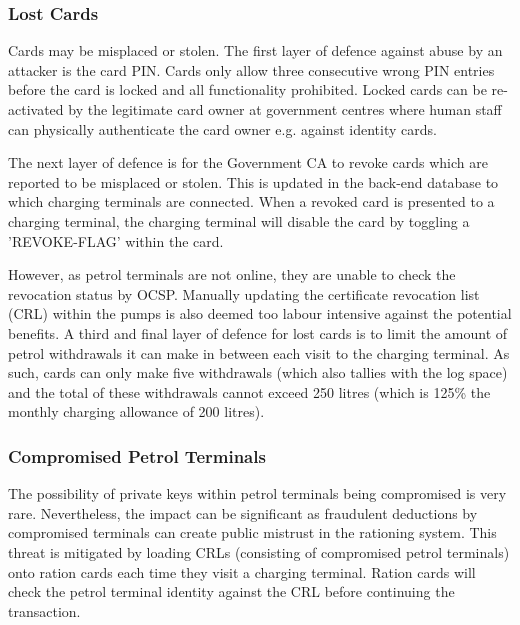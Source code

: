 \subsubsection{Lost Cards}
Cards may be misplaced or stolen. The first layer of defence against abuse by an attacker is the card PIN. Cards only allow three consecutive wrong PIN entries before the card is locked and all functionality prohibited. Locked cards can be re-activated by the legitimate card owner at government centres where human staff can physically authenticate the card owner e.g. against identity cards.

The next layer of defence is for the Government CA to revoke cards which are reported to be misplaced or stolen. This is updated in the back-end database to which charging terminals are connected. When a revoked card is presented to a charging terminal, the charging terminal will disable the card by toggling a 'REVOKE-FLAG' within the card.

However, as petrol terminals are not online, they are unable to check the revocation status by OCSP. Manually updating the certificate revocation list (CRL) within the pumps is also deemed too labour intensive against the potential benefits. A third and final layer of defence for lost cards is to limit the amount of petrol withdrawals it can make in between each visit to the charging terminal. As such, cards can only make five withdrawals (which also tallies with the log space) and the total of these withdrawals cannot exceed 250 litres (which is 125\% the monthly charging allowance of 200 litres).

\subsubsection{Compromised Petrol Terminals}
The possibility of private keys within petrol terminals being compromised is very rare. Nevertheless, the impact can be significant as fraudulent deductions by compromised terminals can create public mistrust in the rationing system. This threat is mitigated by loading CRLs (consisting of compromised petrol terminals) onto ration cards each time they visit a charging terminal. Ration cards will check the petrol terminal identity against the CRL before continuing the transaction.